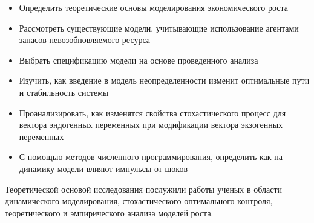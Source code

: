 \documentclass[12pt,a4paper, oneside]{extreport}
\begin{document}
\begin{itemize}
	\item Определить теоретические основы моделирования  экономического роста
	\item Рассмотреть существующие модели, учитывающие использование агентами запасов невозобновляемого  ресурса
	\item Выбрать спецификацию модели на основе проведенного анализа
	\item Изучить, как введение в модель неопределенности изменит оптимальные пути и стабильность системы 
	\item Проанализировать, как изменятся свойства стохастического процесс для вектора  эндогенных переменных при модификации вектора экзогенных переменных
	\item С помощью методов численного программирования, определить   как на динамику модели влияют импульсы от шоков	
\end{itemize}


Теоретической  основой исследования послужили работы ученых в области динамического моделирования, стохастического оптимального контроля, теоретического и эмпирического  анализа моделей роста.  
\end{document}
